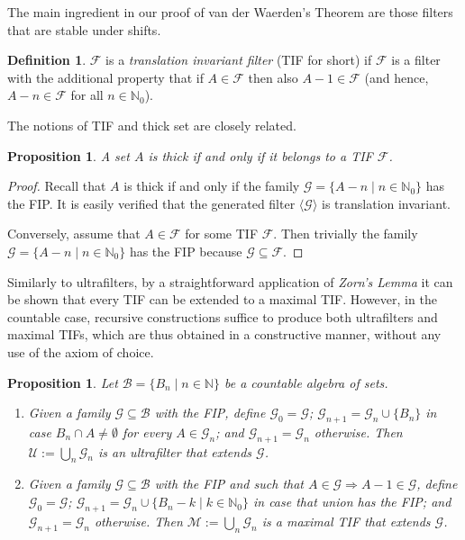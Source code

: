\documentclass[10pt]{amsart}
\newtheorem{proposition}[theorem]{Proposition}
\theoremstyle{definition}
\newtheorem{definition}[theorem]{Definition}
\theoremstyle{remark}
\def\N{\mathbb{N}}
\def\B{\mathcal{B}}
\def\F{\mathcal{F}}
\def\G{\mathcal{G}}
\def\U{\mathcal{U}}
\begin{document}
The main ingredient in our proof of van der Waerden's Theorem
are those filters that are stable under shifts.

\begin{definition}
$\F$ is a \emph{translation invariant filter} (TIF for short)
if $\F$ is a filter with the additional property
that if $A\in\F$ then also $A-1\in\F$ (and hence, $A-n\in\F$ for all $n\in\N_0$).
\end{definition}

The notions of TIF and thick set are closely related.

\begin{proposition}\label{thickTIF}
A set $A$ is thick if and only if it belongs to a TIF $\F$.
\end{proposition}

\begin{proof}
Recall that $A$ is thick if and only if the family $\G=\{A-n\mid n\in\N_0\}$
has the FIP. It is easily verified that the generated
filter $\langle\G\rangle$ is translation invariant.

Conversely, assume that $A\in\F$ for some TIF $\F$.
Then trivially the family $\G=\{A-n\mid n\in\N_0\}$ has the FIP because $\G\subseteq\F$.
\end{proof}

Similarly to ultrafilters,
by a straightforward application of \emph{Zorn's Lemma}
it can be shown that every TIF can be extended to a maximal TIF.
However, in the countable case, recursive constructions suffice
to produce both ultrafilters and maximal TIFs, which are thus obtained
in a constructive manner, without any use of the axiom of choice.

\begin{proposition}\label{maximal}
Let $\B=\{B_n\mid n\in\N\}$ be a countable algebra of sets.
\begin{enumerate}
\item
Given a family $\G\subseteq\B$ with the FIP, define 
$\G_0=\G$; $\G_{n+1}=\G_n\cup\{B_n\}$
in case $B_n\cap A\ne\emptyset$ for every $A\in\G_n$; and
$\G_{n+1}=\G_n$ otherwise. Then 
$\U:=\bigcup_n\G_n$ is an ultrafilter that extends $\G$.
\item
Given a family $\G\subseteq\B$ with the FIP
and such that $A\in\G\Rightarrow A-1\in\G$, define 
$\G_0=\G$; $\G_{n+1}=\G_n\cup\{B_n-k\mid k\in\N_0\}$
in case that union has the FIP; and
$\G_{n+1}=\G_n$ otherwise. Then 
$\mathcal{M}:=\bigcup_n\G_n$ is a maximal TIF
that extends $\G$.
\end{enumerate}
\end{proposition}
\end{document}
